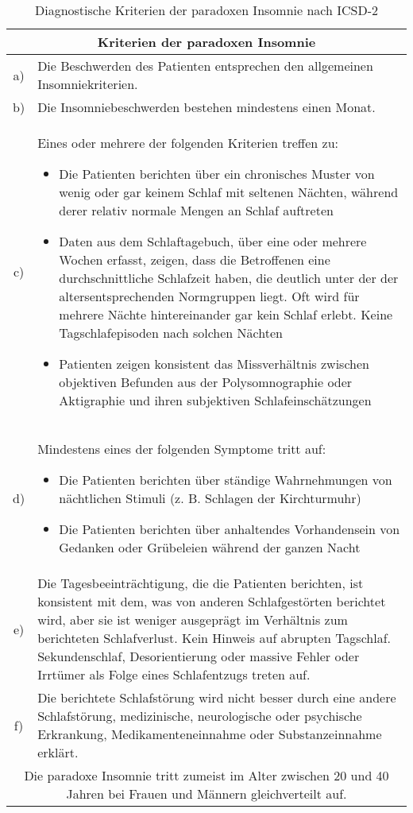 \begin{table}[H] 
\centering
\begin{tabularx}{\textwidth}{cX}
\toprule
\multicolumn{2}{c}{\textbf{Kriterien der paradoxen Insomnie}}\\
\midrule 
a) & Die Beschwerden des Patienten entsprechen den allgemeinen Insomniekriterien.\\
b) & Die Insomniebeschwerden bestehen mindestens einen Monat.\\
c) & Eines oder mehrere der folgenden Kriterien treffen zu:
\begin{itemize}
\singlespacing
\setlength\itemsep{0em}
\item Die Patienten berichten über ein chronisches Muster von wenig oder gar keinem Schlaf mit seltenen Nächten, während derer relativ normale Mengen an Schlaf auftreten
\item Daten aus dem Schlaftagebuch, über eine oder mehrere Wochen erfasst, zeigen, dass die Betroffenen eine durchschnittliche Schlafzeit haben, die deutlich unter der der altersentsprechenden Normgruppen liegt. Oft wird für mehrere Nächte hintereinander gar kein Schlaf erlebt. Keine Tagschlafepisoden nach solchen Nächten
\item Patienten zeigen konsistent das Missverhältnis zwischen objektiven Befunden aus der Polysomnographie oder Aktigraphie und ihren subjektiven Schlafeinschätzungen
\end{itemize}\\
d) & Mindestens eines der folgenden Symptome tritt auf:
\begin{itemize}
\singlespacing
\setlength\itemsep{0em}
\item Die Patienten berichten über ständige Wahrnehmungen von nächtlichen Stimuli (z. B. Schlagen der Kirchturmuhr)
\item Die Patienten berichten über anhaltendes Vorhandensein von Gedanken oder Grübeleien während der ganzen Nacht
\end{itemize}\\
e) & Die Tagesbeeinträchtigung, die die Patienten berichten, ist konsistent mit dem, was von anderen Schlafgestörten berichtet wird, aber sie ist weniger ausgeprägt im Verhältnis zum berichteten Schlafverlust. Kein Hinweis auf abrupten Tagschlaf. Sekundenschlaf, Desorientierung oder massive Fehler oder Irrtümer als Folge eines Schlafentzugs treten auf.\\
f) & Die berichtete Schlafstörung wird nicht besser durch eine andere Schlafstörung, medizinische, neurologische oder psychische Erkrankung, Medikamenteneinnahme oder Substanzeinnahme erklärt.\\
\midrule
\multicolumn{2}{p{0.97\textwidth}}{Die paradoxe Insomnie tritt zumeist im Alter zwischen 20 und 40 Jahren bei Frauen und Männern gleichverteilt auf.}\\
\bottomrule
\end{tabularx}
\caption[Kriterien der paradoxen Insomnie]{Diagnostische Kriterien der paradoxen Insomnie nach \acs{ICSD-2} \parencite{mayer_s3-leitlinie_2009, happe_schlafmedizin_2009}}
\label{tab:paradoxe_insomnie}
\end{table}



